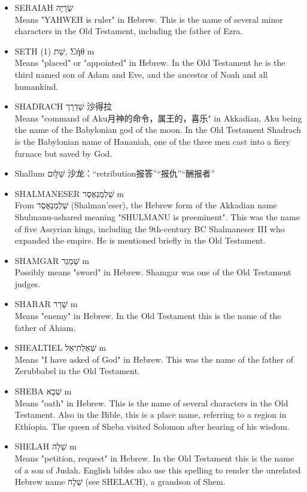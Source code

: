 \begin{itemize}
\item SERAIAH שְׂרָיָה  \\
Means "YAHWEH is ruler" in Hebrew. This is the name of several minor characters in the Old Testament, including the father of Ezra.
\item SETH (1) שֵׁת, Σήθ m \\
Means "placed" or "appointed" in Hebrew. In the Old Testament he is the third named son of Adam and Eve, and the ancestor of Noah and all humankind. 
\item SHADRACH שַׁדְרַך 沙得拉 \\
Means "command of Aku月神的命令，属王的，喜乐" in Akkadian, Aku being the name of the Babylonian god of the moon. In the Old Testament Shadrach is the Babylonian name of Hananiah, one of the three men cast into a fiery furnace but saved by God.
\item Shallum  שַׁלּ֤וּם 沙龙：“retribution报答”“报仇”“酬报者”
\item SHALMANESER שַׁלְמַנְאֶסֶר m \\
From שַׁלְמַנְאֶסֶר (Shalman'eser), the Hebrew form of the Akkadian name Shulmanu-ashared meaning "SHULMANU is preeminent". This was the name of five Assyrian kings, including the 9th-century BC Shalmaneser III who expanded the empire. He is mentioned briefly in the Old Testament.
\item SHAMGAR שַׁמְגַר m \\
Possibly means "sword" in Hebrew. Shamgar was one of the Old Testament judges.
\item SHARAR שָׁרָר m \\
Means "enemy" in Hebrew. In the Old Testament this is the name of the father of Ahiam.
\item SHEALTIEL שְׁאַלְתִיאֵל m \\
Means "I have asked of God" in Hebrew. This was the name of the father of Zerubbabel in the Old Testament.
\item SHEBA שְׁבָא m \\
Means "oath" in Hebrew. This is the name of several characters in the Old Testament. Also in the Bible, this is a place name, referring to a region in Ethiopia. The queen of Sheba visited Solomon after hearing of his wisdom.
\item SHELAH שֵׁלָה m \\
Means "petition, request" in Hebrew. In the Old Testament this is the name of a son of Judah. English bibles also use this spelling to render the unrelated Hebrew name שֵׁלָח (see SHELACH), a grandson of Shem.

\end{itemize}
